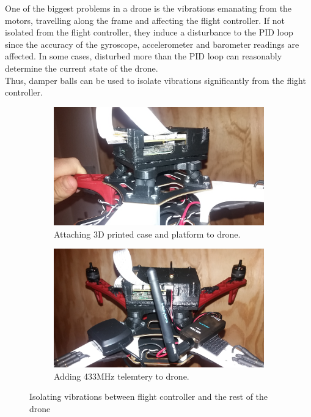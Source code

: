 \noindent
One of the biggest problems in a drone is the vibrations emanating from the motors, travelling along the frame and affecting the flight controller. If not isolated from the flight controller, they induce a disturbance to the PID loop since the accuracy of the gyroscope, accelerometer and barometer readings are affected. In some cases, disturbed more than the PID loop can reasonably determine the current state of the drone.\\

\noindent
Thus, damper balls can be used to isolate vibrations significantly from the flight controller.

\begin{figure}[H]
\begin{subfigure}{0.5\textwidth}
\centering
\includegraphics[scale=0.1]{images/drone-build-case-ondrone.jpg}
\caption{Attaching 3D printed case and platform to drone.}
\label{fig:attach_case_drone}
\end{subfigure}
\begin{subfigure}{0.5\textwidth}
\centering
\includegraphics[scale=0.1]{images/drone-build-433.jpg}
\caption{Adding 433MHz telemtery to drone.}
\label{fig:attach_433}
\end{subfigure}
\caption{Isolating vibrations between flight controller and the rest of the drone}
\label{fig:attach_case_433}
\end{figure}

